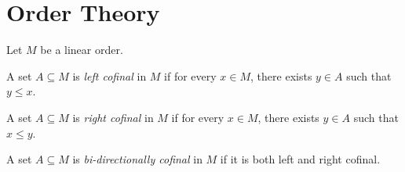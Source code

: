 
\section{Order Theory}
\begin{definition}
  Let $M$ be a linear order.

  A set $A \subseteq M$ is \emph{left cofinal} in $M$ if for every $x \in M$,
  there exists $y \in A$ such that $y \le x$.

  A set $A \subseteq M$ is \emph{right cofinal} in $M$ if for every $x \in M$,
  there exists $y \in A$ such that $x \le y$.

  A set $A \subseteq M$ is \emph{bi-directionally cofinal} in $M$ if it is both left and right cofinal.
\end{definition}